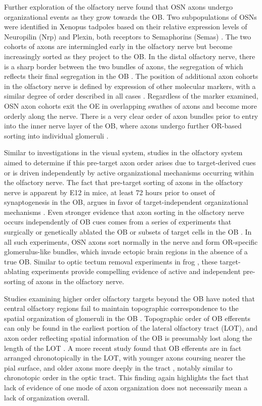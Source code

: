 Further exploration of the olfactory nerve found that OSN axons undergo organizational events as they grow towards the OB.
Two subpopulations of OSNs were identified in Xenopus tadpoles based on their relative expression levels of Neuropilin (Nrp) and Plexin, both receptors to Semaphorins (Semas) \cite{satoda1995differential}.
The two cohorts of axons are intermingled early in the olfactory nerve but become increasingly sorted as they project to the OB.
In the distal olfactory nerve, there is a sharp border between the two bundles of axons, the segregation of which reflects their final segregation in the OB \cite{satoda1995differential}.
The position of additional axon cohorts in the olfactory nerve is defined by expression of other molecular markers, with a similar degree of order described in all cases \cite{imai2009pre,miller2010axon}.
Regardless of the marker examined, OSN axon cohorts exit the OE in overlapping swathes of axons and become more orderly along the nerve.
There is a very clear order of axon bundles prior to entry into the inner nerve layer of the OB, where axons undergo further OR-based sorting into individual glomeruli \cite{imai2009pre,miller2010axon}.

Similar to investigations in the visual system, studies in the olfactory system aimed to determine if this pre-target axon order arises due to target-derived cues or is driven independently by active organizational mechanisms occurring within the olfactory nerve.
The fact that pre-target sorting of axons in the olfactory nerve is apparent by E12 in mice, at least 72 hours prior to onset of synaptogenesis in the OB, argues in favor of target-independent organizational mechanisms \cite{miller2010axon}.
Even stronger evidence that axon sorting in the olfactory nerve occurs independently of OB cues comes from a series of experiments that surgically \cite{graziadei1978regeneration} or genetically ablated the OB \cite{stjohn2003sorting} or subsets of target cells in the OB \cite{bulfone1998olfactory}.
In all such experiments, OSN axons sort normally in the nerve and form OR-specific glomerulus-like bundles, which invade ectopic brain regions in the absence of a true OB.
Similar to optic tectum removal experiments in frog \cite{reh1983organization}, these target-ablating experiments provide compelling evidence of active and independent pre-sorting of axons in the olfactory nerve.

Studies examining higher order olfactory targets beyond the OB have noted that central olfactory regions fail to maintain topographic correspondence to the spatial organization of glomeruli in the OB \cite{luskin1982distribution,sosulski2011distinct}.
Topographic order of OB efferents can only be found in the earliest portion of the lateral olfactory tract (LOT), and axon order reflecting spatial information of the OB is presumably lost along the length of the LOT \cite{price1975observation}.
A more recent study found that OB efferents are in fact arranged chronotopically in the LOT, with younger axons coursing nearer the pial surface, and older axons more deeply in the tract \cite{yamatani2004chronotopic}, notably similar to chronotopic order in the optic tract.
This finding again highlights the fact that lack of evidence of one mode of axon organization does not necessarily mean a lack of organization overall.
